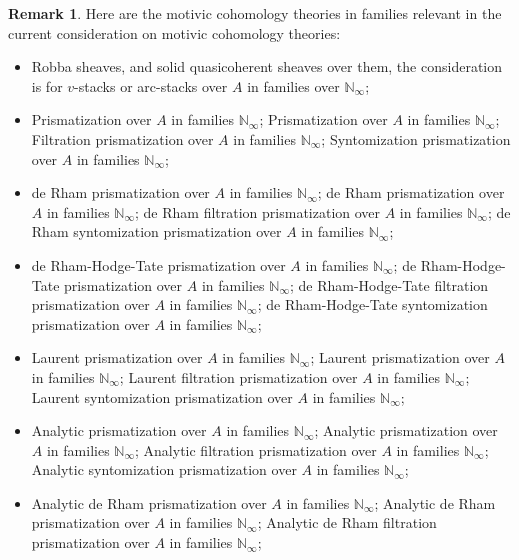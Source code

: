 \documentclass[12pt]{article}
\theoremstyle{definition}
\newtheorem{remark}{Remark}
\begin{document}
\begin{remark}
Here are the motivic cohomology theories in families relevant in the current consideration on motivic cohomology theories:
\begin{itemize}
\item[1] Robba sheaves, and solid quasicoherent sheaves over them, the consideration is for $v$-stacks or arc-stacks over $A$ in families over $\mathbb{N}_\infty$;
\item[2] Prismatization over $A$ in families $\mathbb{N}_\infty$;
\subitem[2I] Prismatization over $A$ in families $\mathbb{N}_\infty$;
\subitem[2II] Filtration prismatization over $A$ in families $\mathbb{N}_\infty$;
\subitem[2III] Syntomization prismatization over $A$ in families $\mathbb{N}_\infty$;
\item[3] de Rham prismatization over $A$ in families $\mathbb{N}_\infty$;
\subitem[3I] de Rham prismatization over $A$ in families $\mathbb{N}_\infty$;
\subitem[3II] de Rham filtration prismatization over $A$ in families $\mathbb{N}_\infty$;
\subitem[3III] de Rham syntomization prismatization over $A$ in families $\mathbb{N}_\infty$;
\item[4] de Rham-Hodge-Tate prismatization over $A$ in families $\mathbb{N}_\infty$;
\subitem[4I] de Rham-Hodge-Tate prismatization over $A$ in families $\mathbb{N}_\infty$;
\subitem[4II] de Rham-Hodge-Tate filtration prismatization over $A$ in families $\mathbb{N}_\infty$;
\subitem[4III] de Rham-Hodge-Tate syntomization prismatization over $A$ in families $\mathbb{N}_\infty$;
\item[5] Laurent prismatization over $A$ in families $\mathbb{N}_\infty$;
\subitem[5I] Laurent prismatization over $A$ in families $\mathbb{N}_\infty$;
\subitem[5II] Laurent filtration prismatization over $A$ in families $\mathbb{N}_\infty$;
\subitem[5III] Laurent syntomization prismatization over $A$ in families $\mathbb{N}_\infty$;
\item[6] Analytic prismatization over $A$ in families $\mathbb{N}_\infty$;
\subitem[6I] Analytic prismatization over $A$ in families $\mathbb{N}_\infty$;
\subitem[6II] Analytic filtration prismatization over $A$ in families $\mathbb{N}_\infty$;
\subitem[6III] Analytic syntomization prismatization over $A$ in families $\mathbb{N}_\infty$;
\item[7] Analytic de Rham prismatization over $A$ in families $\mathbb{N}_\infty$;
\subitem[7I] Analytic de Rham prismatization over $A$ in families $\mathbb{N}_\infty$;
\subitem[7II] Analytic de Rham filtration prismatization over $A$ in families $\mathbb{N}_\infty$;

\end{itemize}
\end{remark}
\end{document}
